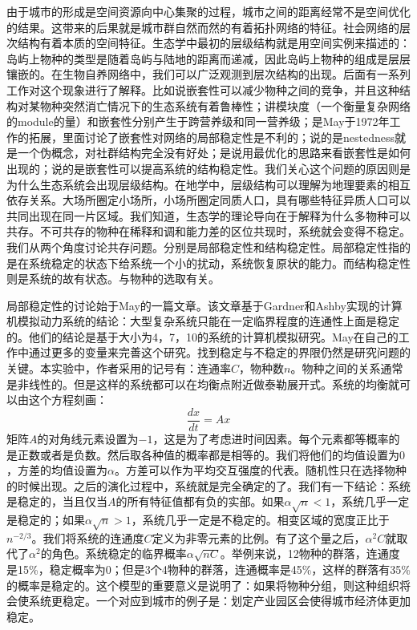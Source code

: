 由于城市的形成是空间资源向中心集聚的过程，城市之间的距离经常不是空间优化的结果。这带来的后果就是城市群自然而然的有着拓扑网络的特征。社会网络的层次结构有着本质的空间特征。生态学中最初的层级结构就是用空间实例来描述的：岛屿上物种的类型是随着岛屿与陆地的距离而递减，因此岛屿上物种的组成是层层镶嵌的。在生物自养网络\cite{Bascompte9383}中，我们可以广泛观测到层次结构的出现。后面有一系列工作对这个现象进行了解释。比如\cite{bastolla2009architecture}说嵌套性可以减少物种之间的竞争，并且这种结构对某物种突然消亡情况下的生态系统有着鲁棒性；\cite{thebault2010stability}讲模块度（一个衡量复杂网络的module的量）和嵌套性分别产生于跨营养级和同一营养级；\cite{Allesina2012}是May于1972年工作的拓展，里面讨论了嵌套性对网络的局部稳定性是不利的；\cite{james2012disentangling}说的是nestedness就是一个伪概念，对社群结构完全没有好处；\cite{suweis2013emergence}是说用最优化的思路来看嵌套性是如何出现的；\cite{rohr2014structural}说的是嵌套性可以提高系统的结构稳定性。我们关心这个问题的原因则是为什么生态系统会出现层级结构。在地学中，层级结构可以理解为地理要素的相互依存关系。大场所圈定小场所，小场所圈定同质人口，具有哪些特征异质人口可以共同出现在同一片区域。我们知道，生态学的理论导向在于解释为什么多物种可以共存。不可共存的物种在稀释和调和能力差的区位共现时，系统就会变得不稳定。我们从两个角度讨论共存问题。分别是局部稳定性和结构稳定性。局部稳定性指的是在系统稳定的状态下给系统一个小的扰动，系统恢复原状的能力。而结构稳定性则是系统的故有状态。与物种的选取有关。

局部稳定性的讨论始于May的一篇文章\cite{may1972will}。该文章基于Gardner和Ashby实现的计算机模拟动力系统的结论：大型复杂系统只能在一定临界程度的连通性上面是稳定的。他们的结论是基于大小为4，7，10的系统的计算机模拟研究。May在自己的工作中通过更多的变量来完善这个研究。找到稳定与不稳定的界限仍然是研究问题的关键。本实验中，作者采用的记号有：连通率\(C\)，物种数\(n\)。物种之间的关系通常是非线性的。但是这样的系统都可以在均衡点附近做泰勒展开式。系统的均衡就可以由这个方程刻画：\[\frac{dx}{dt} = Ax\]矩阵\(A\)的对角线元素设置为\(-1\)，这是为了考虑进时间因素。每个元素都等概率的是正数或者是负数。然后取各种值的概率都是相等的。我们将他们的均值设置为\(0\)，方差的均值设置为\(\alpha\)。方差可以作为平均交互强度的代表。随机性只在选择物种的时候出现。之后的演化过程中，系统就是完全确定的了。我们有一下结论：系统是稳定的，当且仅当\(A\)的所有特征值都有负的实部。如果\(\alpha\sqrt{n}<1\)，系统几乎一定是稳定的；如果\(\alpha\sqrt{n}>1\)，系统几乎一定是不稳定的。相变区域的宽度正比于\(n^{-2/3}\)。我们将系统的连通度\(C\)定义为非零元素的比例。有了这个量之后，\(\alpha^2C\)就取代了\(\alpha^2\)的角色。系统稳定的临界概率\(\alpha\sqrt{nC}\)。举例来说，12物种的群落，连通度是15\%，稳定概率为0；但是3个4物种的群落，连通概率是45\%，这样的群落有35\%的概率是稳定的。这个模型的重要意义是说明了：如果将物种分组，则这种组织将会使系统更稳定。一个对应到城市的例子是：划定产业园区会使得城市经济体更加稳定。

